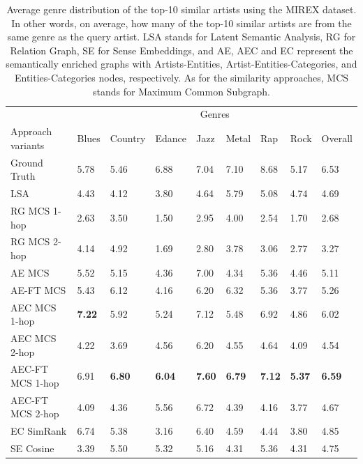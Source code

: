 \begin{table}[]
\scriptsize
\centering
	\begin{tabular}{ lllllllll }
 	\toprule
& \multicolumn{8}{c}{Genres} \\
\cmidrule(lr){2-9}
	Approach variants & Blues & Country & Edance & Jazz & Metal & Rap & Rock & Overall\\
	\midrule
Ground Truth & 5.78 & 5.46 & 6.88 & 7.04 & 7.10 & 8.68 & 5.17 & 6.53\\
\midrule[.2pt]
LSA & 4.43 & 4.12 & 3.80 & 4.64 & 5.79 & 5.08 & 4.74 & 4.69\\
RG MCS 1-hop & 2.63 & 3.50 & 1.50 & 2.95 & 4.00 & 2.54 & 1.70 &  2.68\\
RG MCS 2-hop & 4.14 & 4.92 & 1.69 & 2.80 & 3.78 & 3.06 & 2.77 & 3.27\\
AE MCS & 5.52 & 5.15 & 4.36 & 7.00 & 4.34 & 5.36 & 4.46 & 5.11\\
AE-FT MCS & 5.43 & 6.12 & 4.16 & 6.20 & 6.32 & 5.36 & 3.77 & 5.26 \\
AEC MCS 1-hop & \textbf{7.22} & 5.92 & 5.24 & 7.12 & 5.48 & 6.92 & 4.86 & 6.02 \\
AEC MCS 2-hop & 4.22 & 3.69 & 4.56 & 6.20 & 4.55 & 4.64 & 4.09 & 4.54 \\
AEC-FT MCS 1-hop & 6.91 & \textbf{6.80} & \textbf{6.04} & \textbf{7.60} & \textbf{6.79} & \textbf{7.12} & \textbf{5.37} & \textbf{6.59} \\
AEC-FT MCS 2-hop & 4.09 & 4.36 & 5.56 & 6.72 & 4.39 & 4.16 & 3.77 & 4.67 \\
EC SimRank & 6.74 & 5.38 & 3.16 & 6.40 & 4.59 & 4.44 & 3.80 & 4.85 \\
SE Cosine & 3.39 & 5.50 & 5.32 & 5.16 & 4.31 & 5.36 & 4.31 & 4.75 \\
\bottomrule	
	\end{tabular}
	\caption[Average genre distribution of the top-10 similar artists using the MIREX dataset.]{Average genre distribution of the top-10 similar artists using the MIREX dataset. In other words, on average, how many of the top-10 similar artists are from the same genre as the query artist. LSA stands for Latent Semantic Analysis, RG for Relation Graph, SE for Sense Embeddings, and AE, AEC and EC represent the semantically enriched graphs with Artists-Entities, Artist-Entities-Categories, and Entities-Categories nodes, respectively. As for the similarity approaches, MCS stands for Maximum Common Subgraph.}	
	\label{tbl:similarity:res_genre_distrib}
\end{table}


